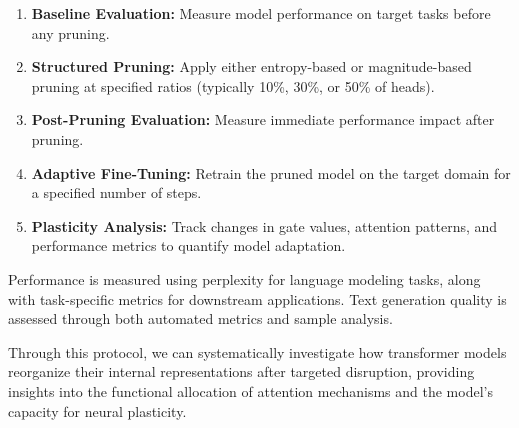 \begin{enumerate}
    \item \textbf{Baseline Evaluation:} Measure model performance on target tasks before any pruning.
    
    \item \textbf{Structured Pruning:} Apply either entropy-based or magnitude-based pruning at specified ratios (typically 10\%, 30\%, or 50\% of heads).
    
    \item \textbf{Post-Pruning Evaluation:} Measure immediate performance impact after pruning.
    
    \item \textbf{Adaptive Fine-Tuning:} Retrain the pruned model on the target domain for a specified number of steps.
    
    \item \textbf{Plasticity Analysis:} Track changes in gate values, attention patterns, and performance metrics to quantify model adaptation.
\end{enumerate}

Performance is measured using perplexity for language modeling tasks, along with task-specific metrics for downstream applications. Text generation quality is assessed through both automated metrics and sample analysis.

Through this protocol, we can systematically investigate how transformer models reorganize their internal representations after targeted disruption, providing insights into the functional allocation of attention mechanisms and the model's capacity for neural plasticity.